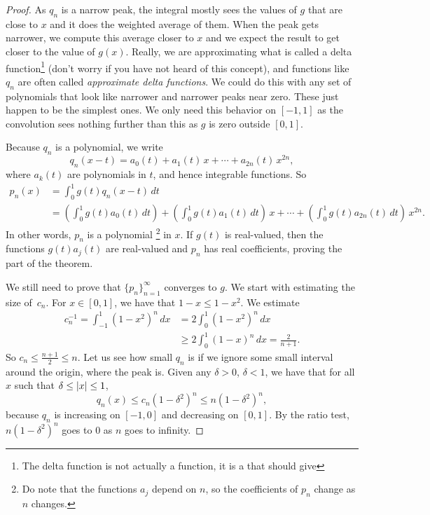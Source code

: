 \begin{proof}
As $q_n$ is a narrow peak, the integral
mostly sees the values of $g$ that are
close to $x$ and it does the weighted average of them.
When the peak gets narrower, we compute this average closer to $x$
and we expect the result to get closer to the value of $g(x)$.  Really, we are
approximating what is called a delta function\footnote{The delta function
is not actually a function,
it is a  that should give
}
(don't worry if you have not
heard of this concept),
and functions like $q_n$ are often called
\emph{approximate delta functions}.
We could do this with any set of polynomials that look like narrower
and narrower peaks near zero.  These just happen to be the simplest ones.
We only need this behavior on $[-1,1]$ as the convolution sees nothing
further than this as $g$ is zero outside $[0,1]$.

Because $q_n$ is a polynomial, we write
\begin{equation*}
q_n(x-t) = a_0(t) + a_1(t)\,x + \cdots + a_{2n}(t)\, x^{2n} ,
\end{equation*}
where $a_k(t)$ are polynomials in $t$, and hence
integrable functions.
So
\begin{equation*}
\begin{split}
p_n(x) & =
\int_{0}^1 g(t)q_n(x-t) \,dt
\\
&=
\left(
\int_0^1
g(t)
a_0(t)\,dt
\right)
+
\left(
\int_0^1
g(t)
a_1(t)\,dt
\right)
\,
x
+
\cdots
+
\left(
\int_0^1
g(t)
a_{2n}(t)\,dt
\right)
\,
x^{2n} .
\end{split}
\end{equation*}
In other words, $p_n$ is a polynomial%
\footnote{%
Do note that the functions $a_j$ depend on $n$, so the coefficients of $p_n$
change as $n$ changes.}
 in $x$.
If $g(t)$ is real-valued, then the functions $g(t)a_j(t)$ are
real-valued and $p_n$ has real coefficients,
proving the  part of the theorem.

We still need to prove that $\{ p_n \}_{n=1}^\infty$ converges to $g$.
We start with estimating the size of~$c_n$.
For $x \in [0,1]$, we have that $1-x \leq 1-x^2$.  We estimate
\begin{equation*}
\begin{split}
c_n^{-1}   = \int_{-1}^1 {(1-x^2)}^n \, dx
& = 2\int_0^1 {(1-x^2)}^n \, dx \\
& \geq 2\int_0^{1} {(1-x)}^n \, dx
= \frac{2}{n+1} .
\end{split}
\end{equation*}
So $c_n \leq \frac{n+1}{2} \leq n$.
Let us see how small $q_n$ is if we ignore some small interval around the origin,
where the peak is.
Given any $\delta > 0$, $\delta < 1$,
we have that for all
$x$ such that $\delta \leq \lvert {x} \rvert \leq 1$,
\begin{equation*}
q_n(x) \leq c_n {(1-\delta^2)}^n \leq  n{(1-\delta^2)}^n ,
\end{equation*}
because $q_n$ is increasing on $[-1,0]$ and decreasing on $[0,1]$.
By the ratio test, 
$n{(1-\delta^2)}^n$ goes to 0 as $n$ goes to infinity.


\end{proof}

